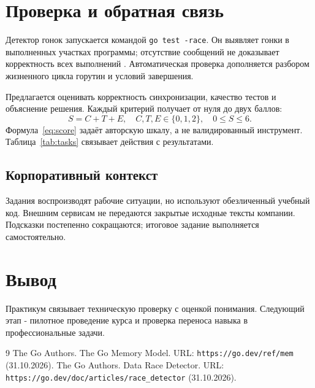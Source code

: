 \documentclass[a4paper,11pt]{article}
\begin{document}
\section{Проверка и обратная связь}
Детектор гонок запускается командой \texttt{go test -race}. Он выявляет гонки в выполненных участках программы; отсутствие сообщений не доказывает корректность всех выполнений \cite{race}. Автоматическая проверка дополняется разбором жизненного цикла горутин и условий завершения.

Предлагается оценивать корректность синхронизации, качество тестов и объяснение решения. Каждый критерий получает от нуля до двух баллов:
\begin{equation}
S=C+T+E,\quad C,T,E\in\{0,1,2\},\quad 0\leq S\leq6.
\label{eq:score}
\end{equation}
Формула~\ref{eq:score} задаёт авторскую шкалу, а не валидированный инструмент. Таблица~\ref{tab:tasks} связывает действия с результатами.
\subsection{Корпоративный контекст}
Задания воспроизводят рабочие ситуации, но используют обезличенный учебный код. Внешним сервисам не передаются закрытые исходные тексты компании. Подсказки постепенно сокращаются; итоговое задание выполняется самостоятельно.
\section{Вывод}
Практикум связывает техническую проверку с оценкой понимания. Следующий этап - пилотное проведение курса и проверка переноса навыка в профессиональные задачи.
\begin{thebibliography}{9}
 The Go Authors. The Go Memory Model. URL: \texttt{https://go.dev/ref/mem} (31.10.2026).
 The Go Authors. Data Race Detector. URL: \texttt{https://go.dev/doc/articles/race\_detector} (31.10.2026).
\end{thebibliography}
\end{document}

